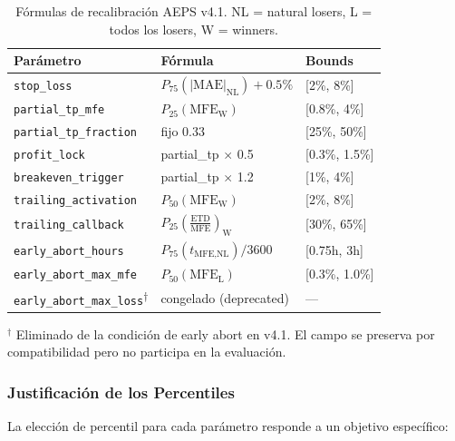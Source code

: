 \documentclass[11pt,a4paper]{article}
\newcommand{\param}[1]{\texttt{\small\color{cpurple}#1}}
\begin{document}
\begin{table}[H]
\centering
\caption{F\'ormulas de recalibraci\'on AEPS v4.1. NL = natural losers,
L = todos los losers, W = winners.}
\label{tab:aeps_formulas}
\begin{tabularx}{\textwidth}{lXl}
\toprule
\textbf{Par\'ametro} & \textbf{F\'ormula} & \textbf{Bounds} \\
\midrule
\param{stop\_loss} & $P_{75}(|\text{MAE}|_{\text{NL}}) + 0.5\%$ & [2\%, 8\%] \\
\param{partial\_tp\_mfe} & $P_{25}(\text{MFE}_{\text{W}})$ & [0.8\%, 4\%] \\
\param{partial\_tp\_fraction} & fijo 0.33 & [25\%, 50\%] \\
\param{profit\_lock} & partial\_tp $\times$ 0.5 & [0.3\%, 1.5\%] \\
\param{breakeven\_trigger} & partial\_tp $\times$ 1.2 & [1\%, 4\%] \\
\param{trailing\_activation} & $P_{50}(\text{MFE}_{\text{W}})$ & [2\%, 8\%] \\
\param{trailing\_callback} & $P_{25}\!\left(\frac{\text{ETD}}{\text{MFE}}\right)_{\text{W}}$ & [30\%, 65\%] \\
\param{early\_abort\_hours} & $P_{75}(t_{\text{MFE,NL}}) / 3600$ & [0.75h, 3h] \\
\param{early\_abort\_max\_mfe} & $P_{50}(\text{MFE}_{\text{L}})$ & [0.3\%, 1.0\%] \\
\param{early\_abort\_max\_loss}\textsuperscript{$\dagger$} & congelado (deprecated) & --- \\
\bottomrule
\end{tabularx}

\vspace{4pt}
{\small $^\dagger$ Eliminado de la condici\'on de early abort en v4.1.
El campo se preserva por compatibilidad pero no participa en la evaluaci\'on.}
\end{table}

\subsubsection{Justificaci\'on de los Percentiles}

La elecci\'on de percentil para cada par\'ametro responde a un
objetivo espec\'ifico:
\end{document}
